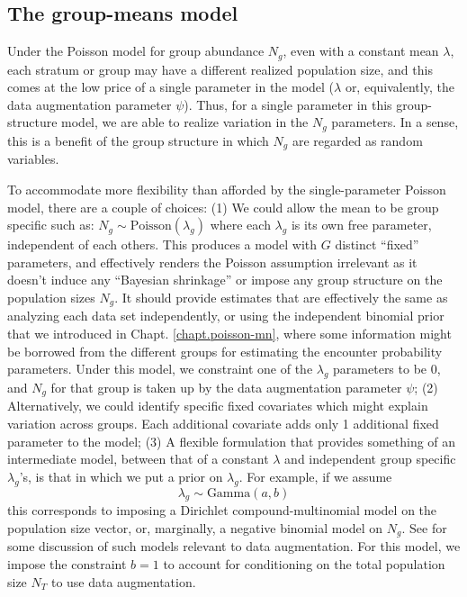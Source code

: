 \subsection{The group-means model}

Under the Poisson model for group abundance $N_g$, even with a
constant mean $\lambda$, each stratum or group may have a different
realized population size, and this comes at the low price of a single
parameter in the model ($\lambda$ or, equivalently, the data
augmentation parameter $\psi$).  Thus, for a single parameter in this
group-structure model, we are able to realize variation in the $N_{g}$
parameters. In a sense, this is a benefit of the group structure in
which $N_{g}$ are regarded as random variables.

To accommodate more flexibility than afforded by the single-parameter
Poisson model, there are a couple of choices: (1) We could allow the
mean to be group specific such as: $N_g \sim
\mbox{Poisson}(\lambda_{g})$ where each $\lambda_{g}$ is its own free
parameter, independent of each others. This produces a model with $G$
distinct ``fixed'' parameters, and effectively renders the Poisson
assumption irrelevant as it doesn't induce any ``Bayesian shrinkage''
\citep{sauer_link:2002} or impose any group structure on the
population sizes $N_{g}$. It should provide estimates that are
effectively the same as analyzing each data set independently, or
using the independent binomial prior that we introduced in
Chapt. \ref{chapt.poisson-mn}, where some information might be
borrowed from the different groups for estimating the encounter
probability parameters.  Under this model, we constraint one of the
$\lambda_{g}$ parameters to be 0, and $N_{g}$ for that group is taken
up by the data augmentation parameter $\psi$; (2) Alternatively, we
could identify specific fixed covariates which might explain variation
across groups. Each additional covariate adds only 1 additional fixed
parameter to the model; (3) A flexible formulation that provides
something of an intermediate model, between that of a constant
$\lambda$ and independent group specific $\lambda_{g}$'s, is that in
which we put a prior on $\lambda_{g}$. For example, if we assume
\[
 \lambda_{g} \sim \mbox{Gamma}(a,b)
\]
this corresponds to imposing a Dirichlet compound-multinomial
model on the population size vector, or, marginally, a negative
binomial model on $N_{g}$. See \citet{takemura:1999} for some
discussion of such models relevant to data augmentation.  For this
model, we impose the constraint $b=1$ to account for conditioning on
the total population size $N_{T}$ to use data augmentation.



